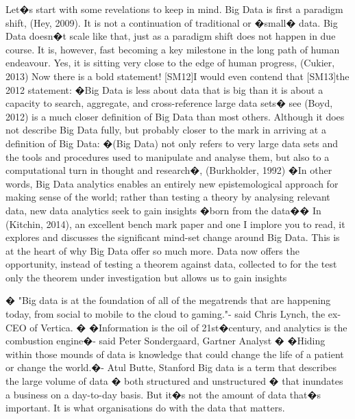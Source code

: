Let�s start with some revelations to keep in mind.  Big Data is first a paradigm shift,  (Hey, 2009). It is not a continuation of traditional or �small� data.  Big Data doesn�t scale like that, just as a paradigm shift does not happen in due course.  It is, however, fast becoming a key milestone in the long path of human endeavour.  Yes, it is sitting very close to the edge of human progress, (Cukier, 2013)  Now there is a bold statement!  [SM12]I would even contend that [SM13]the 2012 statement:  �Big Data is less about data that is big than it is about a capacity to search, aggregate, and cross-reference large data sets� see (Boyd, 2012)  is a much closer definition of Big Data than most others.  Although it does not describe Big Data fully, but probably closer to the mark in arriving at a definition of Big Data: �(Big Data) not only refers to very large data sets and the tools and procedures used to manipulate and analyse them, but also to a computational turn in thought and research�, (Burkholder, 1992)
 �In other words, Big Data analytics enables an entirely new epistemological approach for making sense of the world; rather than testing a theory by analysing relevant data, new data analytics seek to gain insights �born from the data��  In (Kitchin, 2014), an excellent bench mark paper and one I implore you to read, it explores and discusses the significant mind-set change around Big Data.  This is at the heart of why Big Data offer so much more.   Data now offers the opportunity, instead of testing a theorem against data, collected to for the test only the theorem under investigation but allows us to gain insights 

� "Big data is at the foundation of all of the megatrends that are happening today, from social to mobile to the cloud to gaming."- said Chris Lynch, the ex-CEO of Vertica. 
� �Information is the oil of 21st�century, and analytics is the combustion engine�- said Peter Sondergaard, Gartner Analyst 
� �Hiding within those mounds of data is knowledge that could change the life of a patient or change the world.�- Atul Butte, Stanford
Big data is a term that describes the large volume of data � both structured and unstructured � that inundates a business on a day-to-day basis. But it�s not the amount of data that�s important. It is what organisations do with the data that matters. 

